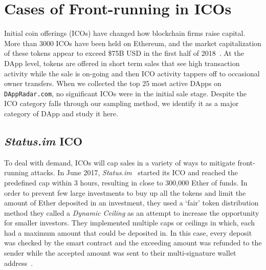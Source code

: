  


\section{Cases of Front-running in ICOs}  \label{sec:ICOsfrontrunning}

Initial coin offerings (ICOs) have changed how blockchain firms raise capital. More than 3000 ICOs have been held on Ethereum, and the market capitalization of these tokens appear to exceed \$75B USD in the first half of 2018~\cite{zetzsche2018ico}. At the DApp level, tokens are offered in short term sales that see high transaction activity while the sale is on-going and then ICO activity tappers off to occasional owner transfers. When we collected the top 25 most active DApps on \texttt{DAppRadar.com}, no significant ICOs were in the initial sale stage. Despite the ICO category falls through our sampling method, we identify it as a major category of DApp and study it here. 




\subsection{\textit{Status.im} ICO}
To deal with demand, ICOs will cap sales in a variety of ways to mitigate front-running attacks. In June 2017, \textit{Status.im}~\cite{statuswhitepaper} started its ICO and reached the predefined cap within 3 hours, resulting in close to 300,000 Ether of funds. In order to prevent few large investments to buy up all the tokens and limit the amount of Ether deposited in an investment, they used a `fair' token distribution method they called a \textit{Dynamic Ceiling} as an attempt to increase the opportunity for smaller investors. They implemented multiple caps or ceilings in which, each had a maximum amount that could be deposited in. In this case, every deposit was checked by the smart contract and the exceeding amount was refunded to the sender while the accepted amount was sent to their multi-signature wallet address~\cite{statusicoanalysis}. 

